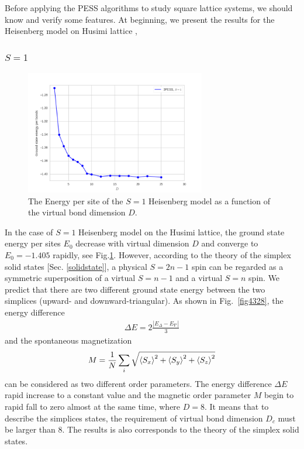 Before applying the PESS algorithms to study square lattice systems, we should know and verify some features. At beginning, we present the results for the Heisenberg model on Husimi lattice \cite{Husimi1, Husimi2},

\subsubsection{$S=1$}

\begin{figure}[!hb]
	\centering
	\includegraphics[width=0.7\textwidth]{figures/3pess_S1GE.png}
	\caption[The Energy per site of the $S=1$ Heisenberg model as a function of the virtual bond dimension $D$]{The Energy per site of the $S=1$ Heisenberg model as a function of the virtual bond dimension $D$.}
	\label{fig4327}
\end{figure}

In the case of $S=1$ Heisenberg model on the Husimi lattice, the ground state energy per sites $E_0$ decrease with virtual dimension $D$ and converge to $E_0=-1.405$ rapidly, see Fig.\ref{fig4327}. However, according to the theory of the simplex solid states [Sec. \ref{solidstate}], a physical $S=2n-1$ spin can be regarded as a symmetric superposition of a virtual $S=n-1$ and a virtual $S=n$ spin. We predict that there are two different ground state energy between the two simplices (upward- and downward-triangular). As shown in Fig.~\ref{fig4328}, the energy difference
\begin{align}
	\Delta E = 2 \frac{|E_{\Delta}-E_{\nabla}|}{3}
\end{align}
and the spontaneous magnetization
\begin{align}
	M = \frac{1}{N} \sum_{i}{\sqrt{\braket{S_x}^2 + \braket{S_y}^2 + \braket{S_z}^2}}
\end{align}
can be considered as two different order parameters. The energy difference $\Delta E$ rapid increase to a constant value and the magnetic order parameter $M$ begin to rapid fall to zero almost at the same time, where $D=8$. It means that to describe the simplices states, the requirement of virtual bond dimension $D_c$ must be larger than $8$. The results is also corresponds to the theory of the simplex solid states.

